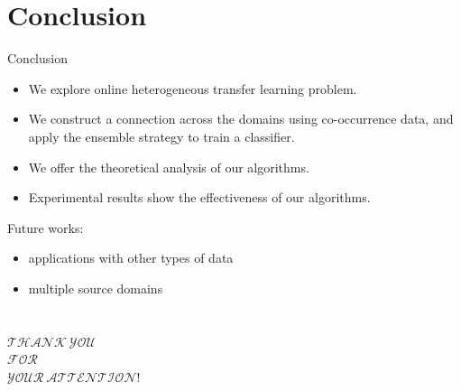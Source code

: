 \documentclass{beamer}
\begin{document}
\section{Conclusion}
\begin{frame}{Conclusion}
\begin{itemize}
\item
We explore online heterogeneous transfer learning problem.
\item
We construct a connection across the domains using co-occurrence data, and apply the ensemble strategy to train a classifier.
\item
We offer the theoretical analysis of our algorithms.
\item
Experimental results show the effectiveness of our algorithms.
\end{itemize}
Future works:
\begin{itemize}
\item
applications with other types of data
\item
multiple source domains
\end{itemize}
\end{frame}

%
%

\section{}
\begin{frame}{}{}
\begin{center}
\begin{Huge}
$ \mathcal{THANK \ YOU}$ \\
$ \mathcal{FOR} $ \\
$ \mathcal{YOUR \ ATTENTION!}$ \\
\end{Huge}
\end{center}
\end{frame}
\end{document}
